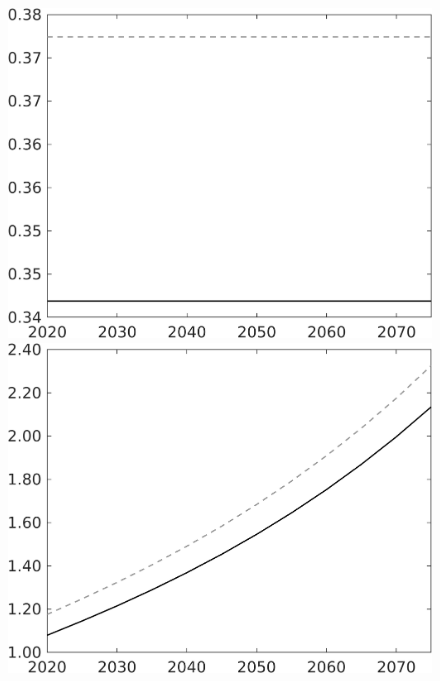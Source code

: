 \begin{figure}[h!!]
\begin{minipage}[]{0.32\textwidth}
\end{minipage}	
\begin{minipage}[]{0.32\textwidth}
\includegraphics[width=1\textwidth]{../../codding_model/own_basedOnFried/optimalPol_010922_revision/figures/all_13Sept22/CompTaul_Equlab_LFBAU_Reg0_hh_spillover0_nsk1_xgr1_knspil0_sep1_countec0_GovRev0_etaa0.79_lgd0.png}
\end{minipage}	
\begin{minipage}[]{0.32\textwidth}
\includegraphics[width=1\textwidth]{../../codding_model/own_basedOnFried/optimalPol_010922_revision/figures/all_13Sept22/CompTaul_Equlab_LFBAU_Reg0_C_spillover0_nsk1_xgr1_knspil0_sep1_countec0_GovRev0_etaa0.79_lgd0.png}

\end{minipage}
\end{figure}
